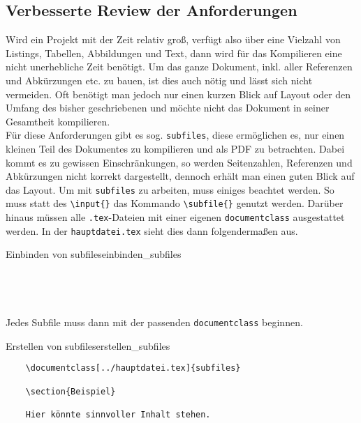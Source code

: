 \subsection{Verbesserte Review der Anforderungen}


Wird ein Projekt mit der Zeit relativ groß, verfügt also über eine Vielzahl von
Listings, Tabellen, Abbildungen und Text, dann wird für das Kompilieren eine nicht
unerhebliche Zeit benötigt. Um das ganze Dokument, inkl. aller Referenzen und
Abkürzungen etc. zu bauen, ist dies auch nötig und lässt sich nicht vermeiden.
Oft benötigt man jedoch nur einen kurzen Blick auf Layout oder den Umfang des bisher
geschriebenen und möchte nicht das Dokument in seiner Gesamtheit kompilieren.\\
Für diese Anforderungen gibt es sog. \texttt{subfiles}, diese ermöglichen es, nur
einen kleinen Teil des Dokumentes zu kompilieren und als PDF zu betrachten. Dabei
kommt es zu gewissen Einschränkungen, so werden Seitenzahlen, Referenzen und Abkürzungen
nicht korrekt dargestellt, dennoch erhält man einen guten Blick auf das Layout.
Um mit \texttt{subfiles} zu arbeiten, muss einiges beachtet werden.
So muss statt des \texttt{\textbackslash input\{\}} das Kommando \texttt{\textbackslash subfile\{\}}
genutzt werden. Darüber hinaus müssen alle \texttt{.tex}-Dateien mit einer eigenen \texttt{documentclass}
ausgestattet werden. In der \texttt{hauptdatei.tex} sieht dies dann folgendermaßen aus.

\begin{code}{Einbinden von subfiles}{einbinden_subfiles}
\begin{verbatim}
	
	
	
\end{verbatim}
\end{code}

Jedes Subfile muss dann mit der passenden \texttt{documentclass} beginnen. 

\begin{code}{Erstellen von subfiles}{erstellen_subfiles}
\begin{verbatim}
	\documentclass[../hauptdatei.tex]{subfiles}
	
	\section{Beispiel}

	Hier könnte sinnvoller Inhalt stehen. 

	
\end{verbatim}
\end{code}

